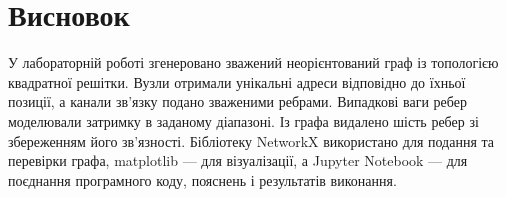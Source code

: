 \documentclass[12pt,a4paper]{article}
\begin{document}
\section{Висновок}

У лабораторній роботі згенеровано зважений неорієнтований граф із топологією
квадратної решітки. Вузли отримали унікальні адреси відповідно до їхньої
позиції, а канали зв'язку подано зваженими ребрами. Випадкові ваги ребер
моделювали затримку в заданому діапазоні. Із графа видалено шість ребер зі
збереженням його зв'язності. Бібліотеку NetworkX використано для подання та
перевірки графа, matplotlib --- для візуалізації, а Jupyter Notebook --- для
поєднання програмного коду, пояснень і результатів виконання.
\end{document}
